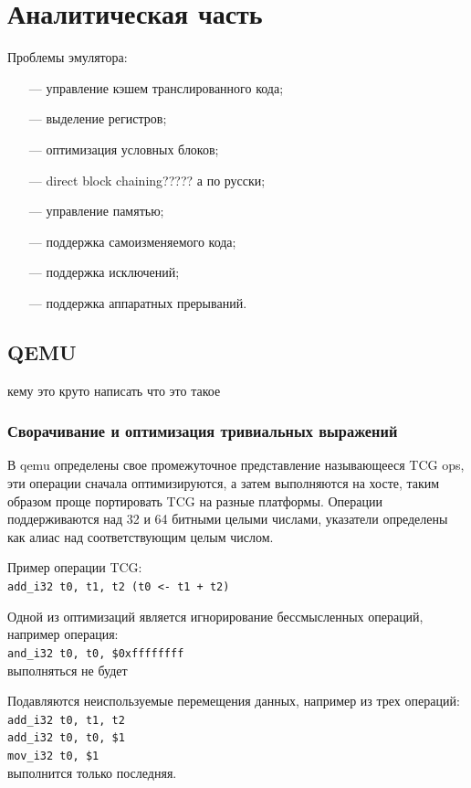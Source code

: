 \section{Аналитическая часть}

Проблемы эмулятора:
\begin{itemize}[leftmargin=1.6\parindent]
	\item[---] управление кэшем транслированного кода;
	\item[---] выделение регистров;
	\item[---] оптимизация условных блоков;
	\item[---] direct block chaining????? а по русски;
	\item[---] управление памятью;
	\item[---] поддержка самоизменяемого кода;
	\item[---] поддержка исключений;
	\item[---] поддержка аппаратных прерываний.
\end{itemize}

\subsection{QEMU}

кему это круто написать что это такое \cite{qemu}

\subsubsection{Сворачивание и оптимизация тривиальных выражений}

В qemu определены свое промежуточное представление называющееся TCG ops, эти операции сначала оптимизируются, а затем выполняются на хосте, таким образом проще портировать TCG на разные платформы. Операции поддерживаются над 32 и 64 битными целыми числами, указатели определены как алиас над соответствующим целым числом.

Пример операции TCG:\\
\texttt{add\_i32 t0, t1, t2  (t0 <- t1 + t2)}

Одной из оптимизаций является игнорирование бессмысленных операций, например операция:\\
\texttt{and\_i32 t0, t0, \$0xffffffff\\}
выполняться не будет

Подавляются неиспользуемые перемещения данных, например из трех операций:\\
\texttt{add\_i32 t0, t1, t2\\
add\_i32 t0, t0, \$1\\
mov\_i32 t0, \$1\\}
выполнится только последняя.

